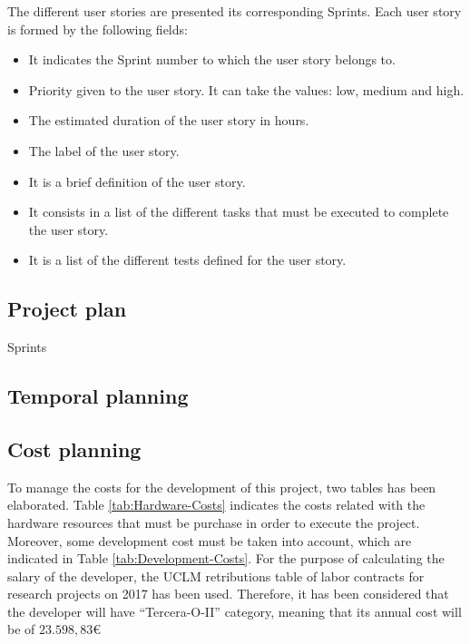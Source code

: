 The different user stories are presented its corresponding Sprints. Each user story is formed by the following fields:
\begin{itemize}
	\item {} It indicates the Sprint number to which the user story belongs to.
	\item {} Priority given to the user story. It can take the values: low, medium and high.
	\item {} The estimated duration of the user story in hours. 
	\item {} The label of the user story.
	\item {} It is a brief definition of the user story.
	\item {} It consists in a list of the different tasks that must be executed to complete the user story.
	\item {} It is a list of the different tests defined for the user story.
\end{itemize}

\subsection{Project plan}
\begin{table}[hp]
	\centering
	{\small
		
	}
	\caption{Sprints}
	\label{tab:Sprints}
\end{table}

\subsection{Temporal planning}





\subsection{Cost planning}
To manage the costs for the development of this project, two tables has been elaborated. Table \ref{tab:Hardware-Costs} indicates the costs related with the hardware resources that must be purchase in order to execute the project. Moreover, some development cost must be taken into account, which are indicated in Table \ref{tab:Development-Costs}. For the purpose of calculating the salary of the developer, the \ac{UCLM} retributions table of labor contracts for research projects on 2017 has been used. Therefore, it has been considered that the developer will have “Tercera-O-II” category, meaning that its annual cost will be of $23.598,83$\euro{}

